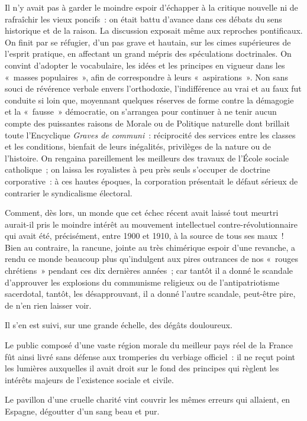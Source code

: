 \documentclass[french,twoside]{book} %
\begin{document}
Il n’y avait pas à garder le moindre espoir d’échapper à la critique nouvelle ni de rafraîchir les vieux poncifs : on était battu d’avance dans ces débats du sens historique et de la raison. La discussion exposait même aux reproches pontificaux. On finit par se réfugier, d’un pas grave et hautain, sur les cimes supérieures de l’esprit pratique, en affectant un grand mépris des spéculations doctrinales. On convint d’adopter le vocabulaire, les idées et les principes en vigueur dans les « masses populaires », afin de correspondre à leurs « aspirations ». Non sans souci de révérence verbale envers l’orthodoxie, l’indifférence au vrai et au faux fut conduite si loin que, moyennant quelques réserves de forme contre la démagogie et la « fausse » démocratie, on s’arrangea pour continuer à ne tenir aucun compte des puissantes raisons de Morale ou de Politique naturelle dont brillait toute l’Encyclique \emph{Graves de communi} : réciprocité des services entre les classes et les conditions, bienfait de leurs inégalités, privilèges de la nature ou de l’histoire. On rengaina pareillement les meilleurs des travaux de l’École sociale catholique ; on laissa les royalistes à peu près seuls s’occuper de doctrine corporative : à ces hautes époques, la corporation présentait le défaut sérieux de contrarier le syndicalisme électoral.\par
Comment, dès lors, un monde que cet échec récent avait laissé tout meurtri aurait-il pris le moindre intérêt au mouvement intellectuel contre-révolutionnaire qui avait été, précisément, entre 1900 et 1910, à la source de tous ses maux ! Bien au contraire, la rancune, jointe au très chimérique espoir d’une revanche, a rendu ce monde beaucoup plus qu’indulgent aux pires outrances de nos « rouges chrétiens » pendant ces dix dernières années ; car tantôt il a donné le scandale d’approuver les explosions du communisme religieux ou de l’antipatriotisme sacerdotal, tantôt, les désapprouvant, il a donné l’autre scandale, peut-être pire, de n’en rien laisser voir.\par
Il s’en est suivi, sur une grande échelle, des dégâts douloureux.\par
Le public composé d’une vaste région morale du meilleur pays réel de la France fût ainsi livré sans défense aux tromperies du verbiage officiel : il ne reçut point les lumières auxquelles il avait droit sur le fond des principes qui règlent les intérêts majeurs de l’existence sociale et civile.\par
Le pavillon d’une cruelle charité vint couvrir les mêmes erreurs qui allaient, en Espagne, dégoutter d’un sang beau et pur.\par
\end{document}
